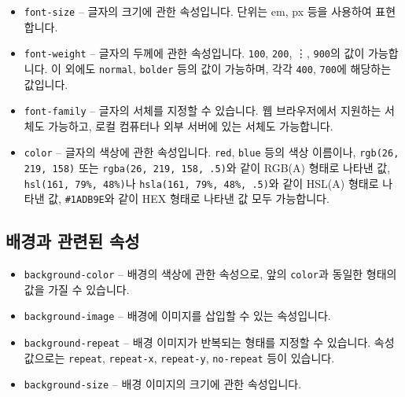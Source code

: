 \begin{itemize}
    \item \texttt{font-size} – 글자의 크기에 관한 속성입니다. 단위는 em, px 등을 사용하여 표현합니다. 
    \item \texttt{font-weight} – 글자의 두께에 관한 속성입니다. \texttt{100}, \texttt{200}, \vdots, \texttt{900}의 값이 가능합니다. 이 외에도 \texttt{normal}, \texttt{bolder} 등의 값이 가능하며, 각각 \texttt{400}, \texttt{700}에 해당하는 값입니다. 
    \item \texttt{font-family} – 글자의 서체를 지정할 수 있습니다. 웹 브라우저에서 지원하는 서체도 가능하고, 로컬 컴퓨터나 외부 서버에 있는 서체도 가능합니다. 
    \item \texttt{color} – 글자의 색상에 관한 속성입니다. \texttt{red}, \texttt{blue} 등의 색상 이름이나, \texttt{rgb(26, 219, 158)} 또는 \texttt{rgba(26, 219, 158, .5)}와 같이 RGB(A) 형태로 나타낸 값, \texttt{hsl(161, 79\%, 48\%)}나 \texttt{hsla(161, 79\%, 48\%, .5)}와 같이 HSL(A) 형태로 나타낸 값, \texttt{\#1ADB9E}와 같이 HEX 형태로 나타낸 값 모두 가능합니다. 
\end{itemize}

\subsection*{배경과 관련된 속성}

\begin{itemize}
    \item \texttt{background-color} – 배경의 색상에 관한 속성으로, 앞의 \texttt{color}과 동일한 형태의 값을 가질 수 있습니다. 
    \item \texttt{background-image} – 배경에 이미지를 삽입할 수 있는 속성입니다. 
    \item \texttt{background-repeat} – 배경 이미지가 반복되는 형태를 지정할 수 있습니다. 속성값으로는 \texttt{repeat}, \texttt{repeat-x}, \texttt{repeat-y}, \texttt{no-repeat} 등이 있습니다. 
    \item \texttt{background-size} – 배경 이미지의 크기에 관한 속성입니다. 
\end{itemize}
